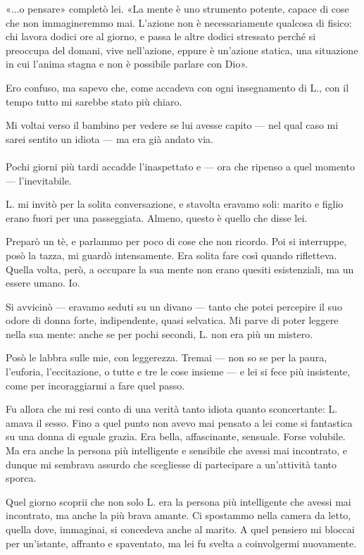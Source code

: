\documentclass[a4paper,12pt]{book}
\begin{document}
«...o pensare» completò lei. «La mente è uno strumento potente, capace di cose
che non immagineremmo mai. L'azione non è necessariamente qualcosa di fisico:
chi lavora dodici ore al giorno, e passa le altre dodici stressato perché si
preoccupa del domani, vive nell'azione, eppure è un'azione statica, una
situazione in cui l'anima stagna e non è possibile parlare con Dio».

Ero confuso, ma sapevo che, come accadeva con ogni insegnamento di L., con il
tempo tutto mi sarebbe stato più chiaro.

Mi voltai verso il bambino per vedere se lui avesse capito --- nel qual caso mi
sarei sentito un idiota --- ma era già andato via.

\paragraph{}
Pochi giorni più tardi accadde l'inaspettato e --- ora che ripenso a quel
momento --- l'inevitabile.

L. mi invitò per la solita conversazione, e stavolta eravamo soli: marito e
figlio erano fuori per una passeggiata. Almeno, questo è quello che disse lei.

Preparò un tè, e parlammo per poco di cose che non ricordo. Poi si interruppe,
posò la tazza, mi guardò intensamente. Era solita fare così quando rifletteva.
Quella volta, però, a occupare la sua mente non erano quesiti esistenziali, ma
un essere umano. Io.

Si avvicinò --- eravamo seduti su un divano --- tanto che potei percepire il suo
odore di donna forte, indipendente, quasi selvatica. Mi parve di poter leggere
nella sua mente: anche se per pochi secondi, L. non era più un mistero.

Posò le labbra sulle mie, con leggerezza. Tremai --- non so se per la paura,
l'euforia, l'eccitazione, o tutte e tre le cose insieme --- e lei si fece più
insistente, come per incoraggiarmi a fare quel passo.

Fu allora che mi resi conto di una verità tanto idiota quanto sconcertante:
L. amava il sesso. Fino a quel punto non avevo mai pensato a lei come si
fantastica su una donna di eguale grazia. Era bella, affascinante, sensuale.
Forse volubile. Ma era anche la persona più intelligente e sensibile che avessi
mai incontrato, e dunque mi sembrava assurdo che scegliesse di partecipare a
un'attività tanto sporca.

Quel giorno scoprii che non solo L. era la persona più intelligente che avessi
mai incontrato, ma anche la più brava amante. Ci spostammo nella camera da
letto, quella dove, immaginai, si concedeva anche al marito. A quel pensiero mi
bloccai per un'istante, affranto e spaventato, ma lei fu svelta a coinvolgermi
nuovamente.
\end{document}
